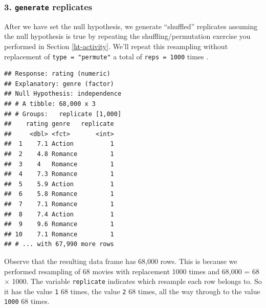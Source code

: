 \documentclass[
]{book}
\newenvironment{Shaded}{\begin{snugshade}}{\end{snugshade}}
\newcommand{\DataTypeTok}[1]{\textcolor[rgb]{0.13,0.29,0.53}{#1}}
\newcommand{\DecValTok}[1]{\textcolor[rgb]{0.00,0.00,0.81}{#1}}
\newcommand{\KeywordTok}[1]{\textcolor[rgb]{0.13,0.29,0.53}{\textbf{#1}}}
\newcommand{\NormalTok}[1]{#1}
\newcommand{\OperatorTok}[1]{\textcolor[rgb]{0.81,0.36,0.00}{\textbf{#1}}}
\newcommand{\StringTok}[1]{\textcolor[rgb]{0.31,0.60,0.02}{#1}}
\begin{document}
\hypertarget{generate-replicates-1}{%
\subsubsection*{\texorpdfstring{3. \texttt{generate} replicates}{3. generate replicates}}\label{generate-replicates-1}}

After we have set the null hypothesis, we generate ``shuffled'' replicates assuming the null hypothesis is true by repeating the shuffling/permutation exercise you performed in Section \ref{ht-activity}. We'll repeat this resampling without replacement of \texttt{type\ =\ "permute"} a total of \texttt{reps\ =\ 1000} times .

\begin{Shaded}
\end{Shaded}

\begin{verbatim}
## Response: rating (numeric)
## Explanatory: genre (factor)
## Null Hypothesis: independence
## # A tibble: 68,000 x 3
## # Groups:   replicate [1,000]
##    rating genre   replicate
##     <dbl> <fct>       <int>
##  1    7.1 Action          1
##  2    4.8 Romance         1
##  3    4   Romance         1
##  4    7.3 Romance         1
##  5    5.9 Action          1
##  6    5.8 Romance         1
##  7    7.1 Romance         1
##  8    7.4 Action          1
##  9    9.6 Romance         1
## 10    7.1 Romance         1
## # ... with 67,990 more rows
\end{verbatim}

Observe that the resulting data frame has 68,000 rows. This is because we performed resampling of 68 movies with replacement 1000 times and 68,000 = 68 \(\times\) 1000. The variable \texttt{replicate} indicates which resample each row belongs to. So it has the value \texttt{1} 68 times, the value \texttt{2} 68 times, all the way through to the value \texttt{1000} 68 times.
\end{document}
